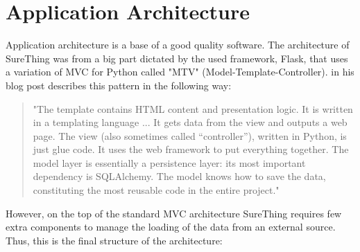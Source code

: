 \section{Application Architecture}
\label{sec:applicationarchitecture}
Application architecture is a base of a good quality software. The architecture of SureThing was from a big part dictated by the used framework, Flask, that uses a variation of MVC for Python called "MTV" (Model-Template-Controller). \cite{article:goodArchitecture} in his blog post describes this pattern in the following way:

\begin{quote}
"The template contains HTML content and presentation logic. It is written in a templating language ... It gets data from the view and outputs a web page. The view (also sometimes called “controller”), written in Python, is just glue code. It uses the web framework to put everything together. The model layer is essentially a persistence layer: its most important dependency is SQLAlchemy. The model knows how to save the data, constituting the most reusable code in the entire project."
\end{quote}

However, on the top of the standard MVC architecture SureThing requires few extra components to manage the loading of the data from an external source. Thus, this is the final structure of the architecture:

